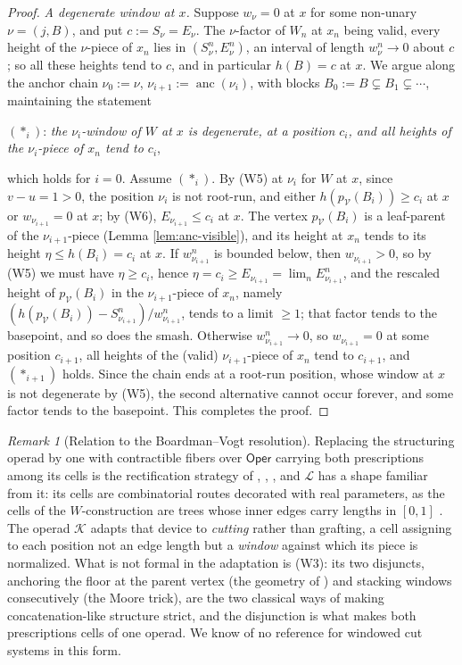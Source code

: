 \documentclass[12pt]{amsart}
\theoremstyle{definition}
\theoremstyle{remark}
\newtheorem{remark}[subsection]{Remark}
\newcommand{\Oper}{\mathsf{Oper}}
\newcommand{\Cal}[1]{\mathcal{#1}}
\newcommand{\Kop}{\mathcal{K}}                   %
\newcommand{\Lop}{\mathcal{L}}                   %
\newcommand{\anc}{\operatorname{anc}}            %
\begin{document}
\begin{proof}
\emph{A degenerate window at $x$.} Suppose $w_\nu = 0$ at $x$ for some non-unary $\nu = (j,B)$, and put $c := S_\nu = E_\nu$. The $\nu$-factor of $W_n$ at $x_n$ being valid, every height of the $\nu$-piece of $x_n$ lies in $(S^n_\nu, E^n_\nu)$, an interval of length $w^n_\nu\to 0$ about $c$; so all these heights tend to $c$, and in particular $h(B) = c$ at $x$. We argue along the anchor chain $\nu_0 := \nu$, $\nu_{i+1} := \anc(\nu_i)$, with blocks $B_0 := B\subsetneq B_1\subsetneq \cdots$, maintaining the statement
\begin{center}
$(\ast_i)$: \emph{the $\nu_i$-window of $W$ at $x$ is degenerate, at a position $c_i$, and all heights of the $\nu_i$-piece of $x_n$ tend to $c_i$},
\end{center}
which holds for $i=0$. Assume $(\ast_i)$. By (W5) at $\nu_i$ for $W$ at $x$, since $v-u = 1 > 0$, the position $\nu_i$ is not root-run, and either $h(p_{\Cal V}(B_i))\geq c_i$ at $x$ or $w_{\nu_{i+1}} = 0$ at $x$; by (W6), $E_{\nu_{i+1}}\leq c_i$ at $x$. The vertex $p_{\Cal V}(B_i)$ is a leaf-parent of the $\nu_{i+1}$-piece (Lemma \ref{lem:anc-visible}), and its height at $x_n$ tends to its height $\eta\leq h(B_i) = c_i$ at $x$. If $w^n_{\nu_{i+1}}$ is bounded below, then $w_{\nu_{i+1}} > 0$, so by (W5) we must have $\eta\geq c_i$, hence $\eta = c_i \geq E_{\nu_{i+1}} = \lim_n E^n_{\nu_{i+1}}$, and the rescaled height of $p_{\Cal V}(B_i)$ in the $\nu_{i+1}$-piece of $x_n$, namely $(h(p_{\Cal V}(B_i)) - S^n_{\nu_{i+1}})/w^n_{\nu_{i+1}}$, tends to a limit $\geq 1$; that factor tends to the basepoint, and so does the smash. Otherwise $w^n_{\nu_{i+1}}\to 0$, so $w_{\nu_{i+1}} = 0$ at some position $c_{i+1}$, all heights of the (valid) $\nu_{i+1}$-piece of $x_n$ tend to $c_{i+1}$, and $(\ast_{i+1})$ holds. Since the chain ends at a root-run position, whose window at $x$ is not degenerate by (W5), the second alternative cannot occur forever, and some factor tends to the basepoint. This completes the proof.
\end{proof}

\begin{remark}[Relation to the Boardman--Vogt resolution]\label{rem:BV-comparison}
Replacing the structuring operad by one with contractible fibers over $\Oper$ carrying both prescriptions among its cells is the rectification strategy of \cite{BV-1}, \cite{BV}, \cite{BM-trees}, and $\Lop$ has a shape familiar from it: its cells are combinatorial routes decorated with real parameters, as the cells of the $W$-construction are trees whose inner edges carry lengths in $[0,1]$ \cite{BM-WConstr}. The operad $\Kop$ adapts that device to \emph{cutting} rather than grafting, a cell assigning to each position not an edge length but a \emph{window} against which its piece is normalized. What is not formal in the adaptation is (W3): its two disjuncts, anchoring the floor at the parent vertex (the geometry of \cite{Ching-thesis}) and stacking windows consecutively (the Moore trick), are the two classical ways of making concatenation-like structure strict, and the disjunction is what makes both prescriptions cells of one operad. We know of no reference for windowed cut systems in this form.
\end{remark}
\end{document}
